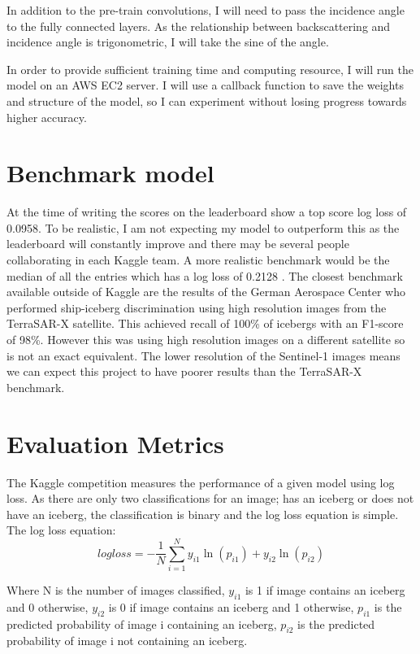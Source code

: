 \documentclass{article}
\begin{document}
In addition to the pre-train convolutions, I will need to pass the incidence angle to the fully connected layers. As the relationship between backscattering and incidence angle is trigonometric, I will take the sine of the angle. 

In order to provide sufficient training time and computing resource, I will run the model on an AWS EC2 server. I will use a callback function to save the weights and structure of the model, so I can experiment without losing progress towards higher accuracy.

\section{Benchmark model}
At the time of writing the scores on the leaderboard show a top score log loss of 0.0958. To be realistic, I am not expecting my model to outperform this as the leaderboard will constantly improve and there may be several people collaborating in each Kaggle team. A more realistic benchmark would be the median of all the entries which has a log loss of 0.2128 \cite{kaggle}.
The closest benchmark available outside of Kaggle are the results of the German Aerospace Center \cite{bentes} who performed ship-iceberg discrimination using high resolution images from the TerraSAR-X satellite. This achieved recall of 100\% of icebergs with an F1-score of 98\%. However this was using high resolution images on a different satellite so is not an exact equivalent. The lower resolution of the Sentinel-1 images means we can expect this project to have poorer results than the TerraSAR-X benchmark. 

\section{Evaluation Metrics}
The Kaggle competition measures the performance of a given model using log loss. As there are only two classifications for an image; has an iceberg or does not have an iceberg, the classification is binary and the log loss equation is simple. The log loss equation: \cite{logloss}
\[ log loss = - \frac{1}{N} \sum_{i=1}^{N} y_{i1}\ln(p_{i1}) + y_{i2}\ln(p_{i2}) \]

Where N is the number of images classified, $y_{i1}$ is 1 if image contains an iceberg and 0 otherwise, $y_{i2}$ is 0 if image contains an iceberg and 1 otherwise, $p_{i1}$ is the predicted probability of image i containing an iceberg, $p_{i2}$ is the predicted probability  of image i not containing an iceberg. 
\end{document}

